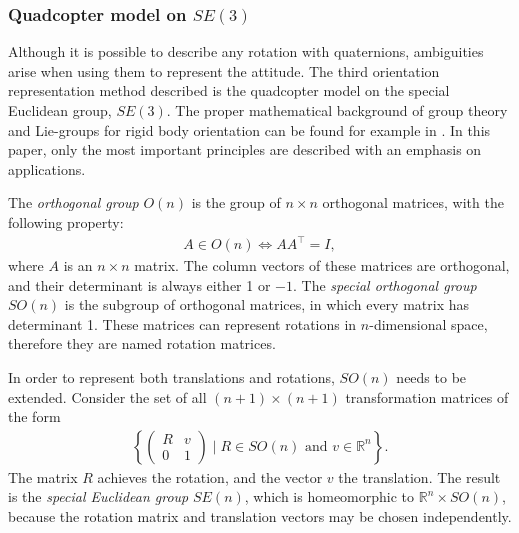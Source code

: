 \subsubsection{Quadcopter model on $SE(3)$}

Although it is possible to describe any rotation with quaternions, ambiguities arise when using them to represent the attitude. The third orientation representation method described is the quadcopter model on the special Euclidean group, $SE(3)$. The proper mathematical background of group theory and Lie-groups for rigid body orientation can be found for example in \cite{isidori1995nonlinear,Leethesis}. In this paper, only the most important principles are described with an emphasis on applications.

The\textit{ orthogonal group }$O(n)$ is the group of $n\times n$ orthogonal matrices, with the following property: 
\begin{align}
    A\in O(n) \Leftrightarrow AA^\top=I,
\end{align}
where $A$ is an $n\times n$ matrix. The column vectors of these matrices are orthogonal, and their determinant is always either 1 or $-1$. The\textit{ special orthogonal group} $SO(n)$ is the subgroup of orthogonal matrices, in which every matrix has determinant 1. These matrices can represent rotations in $n$-dimensional space, therefore they are named rotation matrices.

In order to represent both translations and rotations, $SO(n)$ needs to be extended. Consider the set of all $(n+1)\times (n+1)$ transformation matrices of the form
\begin{align}
    \left\{ \begin{pmatrix}R & v \\ 0 & 1  \end{pmatrix} \;\bigg\vert\; R \in SO(n) \mbox{ and } v \in {\mathbb{R}}^n \right\}.
\end{align}
The matrix $R$ achieves the rotation, and the vector $v$ the translation. The result is the \textit{special Euclidean group} $SE(n)$, which is homeomorphic to $ {\mathbb{R}}^n \times SO(n)$, because the rotation matrix and translation vectors may be chosen independently.

